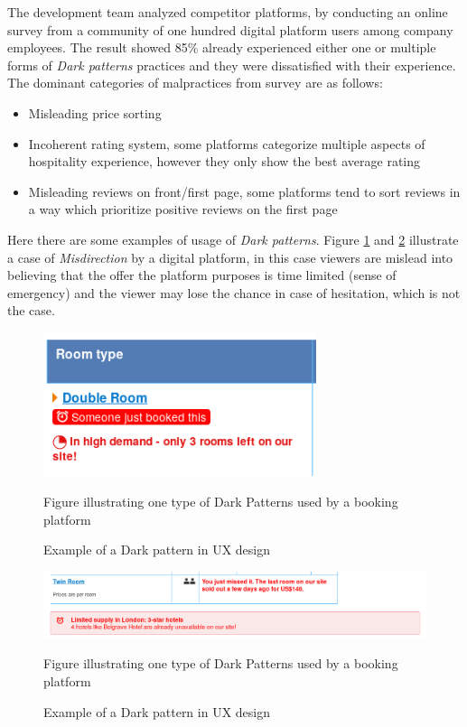 The development team analyzed competitor platforms, by conducting an online survey from a community of one hundred digital platform users among company employees. The result showed 85\% already experienced either one or multiple forms of \textit{Dark patterns} practices and they were dissatisfied with their experience. The dominant categories of malpractices from survey are as follows:
\begin{itemize}
  \item Misleading price sorting
  \item Incoherent rating system, some platforms categorize multiple aspects of hospitality experience, however they only show the best average rating
  \item Misleading reviews on front/first page, some platforms tend to sort reviews in a way which prioritize positive reviews on the first page
\end{itemize}


Here there are some examples of usage of \textit{Dark patterns}. 
Figure \ref{fig:dark_pattern_1} and \ref{fig:dark_pattern_2} illustrate a case of \textit{Misdirection} by a digital platform, in this case viewers are mislead into believing that the offer the platform purposes is time limited (sense of emergency) and the viewer may lose the chance in case of hesitation, which is not the case. 


\begin{figure} 
\centering
\includegraphics[width=8cm]{pictures/dark_pattern1.png}
\caption{Example of a Dark pattern in UX design}
Figure illustrating one type of Dark Patterns used by a booking platform
\label{fig:dark_pattern_1}
\end{figure}

\begin{figure} 
\centering
\includegraphics[width=14cm]{pictures/dark_pattern2.png}
\caption{Example of a Dark pattern in UX design}
Figure illustrating one type of Dark Patterns used by a booking platform
\label{fig:dark_pattern_2}
\end{figure}

